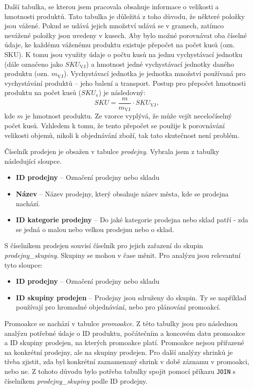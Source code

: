 Další tabulka, se kterou jsem pracovala obsahuje informace o velikosti a hmotnosti produktů. Tato tabulka je důležitá z toho důvodu, že některé položky jsou vážené. Pokud se udává jejich množství udává se v gramech, zatímco nevážené položky jsou uvedeny v kusech. Aby bylo možné porovnávat oba číselné údaje, ke každému váženému produktu existuje přepočet na počet kusů (ozn. SKU). K tomu jsou využity údaje o počtu kusů na jednu vychystávací jednotku (dále označeno jako $SKU_{\mathrm{VJ}}$) a hmotnost jedné vychystávací jednotky daného produktu (ozn. $m_{\mathrm{VJ}}$). Vychystávací jednotka je jednotka množství používaná pro vychystávání produktů -- jeho balení a transport. Postup pro přepočet hmotnosti produktu na počet kusů ($SKU_{\mathrm{v}}$) je následovný: $$SKU = \frac{m}{m_{\mathrm{VJ}}} \cdot SKU_{\mathrm{VJ}},$$
kde $m$ je hmotnost produktu. Ze vzorce vyplývá, že může vejít neceločíselný počet kusů. Vzhledem k tomu, že tento přepočet se použije k porovnávání velikosti objemů, nikoli k objednávání zboží, tak tato skutečnost není problém.

Číselník prodejen je obsažen v tabulce \emph{prodejny}. Vybrala jsem z tabulky následující sloupce.
\begin{itemize}
    \itemsep0em 
    \item \textbf{ID prodejny} -- Označení prodejny nebo skladu
    \item \textbf{Název} -- Název prodejny, který obsahuje název města, kde se prodejna nachází.
    \item \textbf{ID kategorie prodejny} -- Do jaké kategorie prodejna nebo sklad patří - zda se jedná o malou nebo velkou prodejnu nebo o sklad.
\end{itemize}

S číselníkem prodejen souvisí číselník pro jejich zařazení do skupin \emph{prodejny\_skupiny}. Skupiny se mohou v čase měnit. Pro analýzu jsou relevantní tyto sloupce:
\begin{itemize}
    \itemsep0em 
    \item \textbf{ID prodejny} -- Označení prodejny nebo skladu
    \item \textbf{ID skupiny prodejen} -- Prodejny jsou sdruženy do skupin. Ty se například používají pro hromadné objednávání, nebo pro plánování promoakcí.
\end{itemize}    

Promoakce se nachází v tabulce \emph{promoakce}. Z této tabulky jsou pro následnou analýzu potřebné údaje o ID produktu, počátečním a koncovém datu promoakce a ID skupiny prodejen, na kterých promoakce platí. Promoakce nejsou přiřazené na konkrétní prodejny, ale na skupiny prodejen. Pro další analýzy shrinků je třeba zjistit, zda byl konkrétní zaznamenaný shrink v době záznamu v promoakci, nebo ne. Z tohoto důvodu bylo potřeba tabulky spojit pomocí příkazu \texttt{JOIN} s číselníkem \emph{prodejny\_skupiny} podle ID prodejny.

